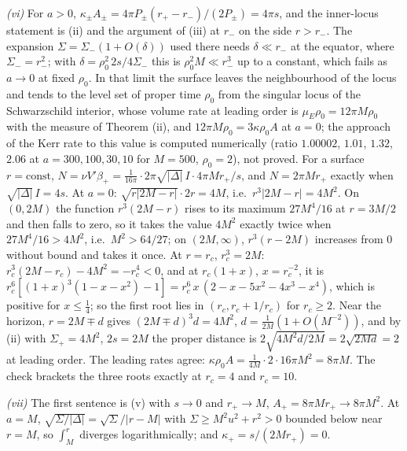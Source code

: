 \emph{(vi)} For $a > 0$, $\kappa_\pm A_\pm = 4\pi P_\pm(r_+ - r_-)/(2P_\pm) = 4\pi s$, and the inner-locus statement is (ii) and the argument of (iii) at $r_-$ on the side $r > r_-$. The expansion $\Sigma = \Sigma_-(1 + O(\delta))$ used there needs $\delta \ll r_-$ at the equator, where $\Sigma_- = r_-^2$; with $\delta = \rho_0^2\,2s/4\Sigma_-$ this is $\rho_0^2M \ll r_-^3$ up to a constant, which fails as $a \to 0$ at fixed $\rho_0$. In that limit the surface leaves the neighbourhood of the locus and tends to the level set of proper time $\rho_0$ from the singular locus of the Schwarzschild interior, whose volume rate at leading order is $\mu_E\rho_0 = 12\pi M\rho_0$ with the measure of Theorem (ii), and $12\pi M\rho_0 = 3\kappa\rho_0A$ at $a = 0$; the approach of the Kerr rate to this value is computed numerically (ratio $1.00002$, $1.01$, $1.32$, $2.06$ at $a = 300, 100, 30, 10$ for $M = 500$, $\rho_0 = 2$), not proved. For a surface $r = \mathrm{const}$, $N = \nu V'\beta_+ = \tfrac{1}{16\pi}\cdot2\pi\sqrt{|\Delta|}\,I\cdot4\pi Mr_+/s$, and $N = 2\pi Mr_+$ exactly when $\sqrt{|\Delta|}\,I = 4s$. At $a = 0$: $\sqrt{r|2M - r|}\cdot2r = 4M$, i.e.\ $r^3|2M - r| = 4M^2$. On $(0, 2M)$ the function $r^3(2M - r)$ rises to its maximum $27M^4/16$ at $r = 3M/2$ and then falls to zero, so it takes the value $4M^2$ exactly twice when $27M^4/16 > 4M^2$, i.e.\ $M^2 > 64/27$; on $(2M, \infty)$, $r^3(r - 2M)$ increases from $0$ without bound and takes it once. At $r = r_c$, $r_c^3 = 2M$: $r_c^3(2M - r_c) - 4M^2 = -r_c^4 < 0$, and at $r_c(1 + x)$, $x = r_c^{-2}$, it is $r_c^6[(1+x)^3(1 - x - x^2) - 1] = r_c^6\,x\,(2 - x - 5x^2 - 4x^3 - x^4)$, which is positive for $x \le \tfrac14$; so the first root lies in $(r_c, r_c + 1/r_c)$ for $r_c \ge 2$. Near the horizon, $r = 2M \mp d$ gives $(2M \mp d)^3d = 4M^2$, $d = \tfrac{1}{2M}(1 + O(M^{-2}))$, and by (ii) with $\Sigma_+ = 4M^2$, $2s = 2M$ the proper distance is $2\sqrt{4M^2d/2M} = 2\sqrt{2Md} = 2$ at leading order. The leading rates agree: $\kappa\rho_0A = \tfrac{1}{4M}\cdot2\cdot16\pi M^2 = 8\pi M$. The check brackets the three roots exactly at $r_c = 4$ and $r_c = 10$.

\emph{(vii)} The first sentence is (v) with $s \to 0$ and $r_+ \to M$, $A_+ = 8\pi Mr_+ \to 8\pi M^2$. At $a = M$, $\sqrt{\Sigma/|\Delta|} = \sqrt{\Sigma}/|r - M|$ with $\Sigma \ge M^2u^2 + r^2 > 0$ bounded below near $r = M$, so $\int_M^r$ diverges logarithmically; and $\kappa_+ = s/(2Mr_+) = 0$.

